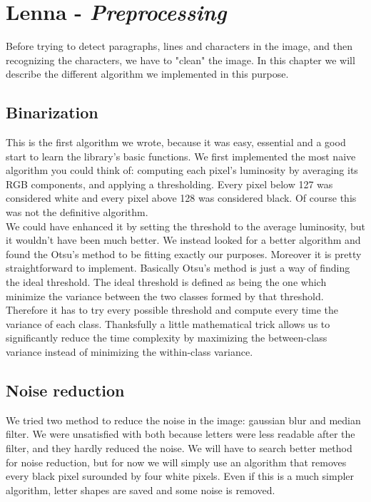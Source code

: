 \chapter{Lenna - \emph{Preprocessing}}

Before trying to detect paragraphs, lines and characters in the image, and then recognizing the characters, we have to "clean" the image. In this chapter we will describe the different algorithm we implemented in this purpose.

\section{Binarization}
This is the first algorithm we wrote, because it was easy, essential and a good
start to learn the library's basic functions. We first implemented the most
naive algorithm you could think of: computing each pixel's luminosity by
averaging its RGB components, and applying a thresholding. Every pixel below 127
was considered white and every pixel above 128 was considered black.
Of course this was not the definitive algorithm.\\

We could have enhanced it by setting the threshold to the average luminosity,
but it wouldn't have been much better. We instead looked for a better algorithm
and found the Otsu's method to be fitting exactly our purposes. Moreover it is
pretty straightforward to implement. Basically Otsu's method is just a way of
finding the ideal threshold. The ideal threshold is defined as being the one
which minimize the variance between the two classes formed by that threshold.
Therefore it has to try every possible threshold and compute every time the
variance of each class. Thanksfully a little mathematical trick allows us to
significantly reduce the time complexity by maximizing the between-class
variance instead of minimizing the within-class variance.\\

\section{Noise reduction}

We tried two method to reduce the noise in the image: gaussian blur and median
filter. We were unsatisfied with both because letters were less readable after
the filter, and they hardly reduced the noise. We will have to search better
method for noise reduction, but for now we will simply use an algorithm that
removes every black pixel surounded by four white pixels. Even if this is a much
simpler algorithm, letter shapes are saved and some noise is removed.

